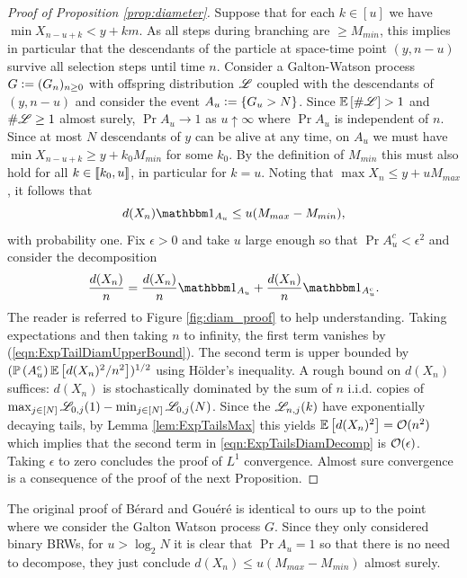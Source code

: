 \begin{proof}[Proof of Proposition \ref{prop:diameter}]
Suppose that for each $k \in [u]$ we have $\min X_{n - u + k} < y + k m$. As all steps during branching are $ \geq M_{min}$, this implies in particular that the descendants of the particle at space-time point $(y, n-u)$ survive all selection steps until time $n$. Consider a Galton-Watson process $G \defeq (G_n)_{n \geq 0}$ with offspring distribution $\scr{L}$ coupled with the descendants of $(y, n-u)$ and consider the event $A_u \defeq \{ G_u > N\}$. Since $\Ex{\#\scr{L}} > 1$ and $\#\scr{L} \geq 1$ almost surely, $\Pr{A_u} \to 1$ as $u \uparrow \infty$ where $\Pr{A_u}$ is independent of $n$. Since at most $N$ descendants of $y$ can be alive at any time, on $A_u$ we must have $\min X_{n - u + k} \geq y + k_0 M_{min}$ for some $k_0$. By the definition of $M_{min}$ this must also hold for all $k \in \bbracket{k_0, u}$, in particular for $k = u$. Noting that $\max X_n \leq y + u M_{max}$, it follows that 
\begin{equation}\label{eqn:ExpTailDiamUpperBound}
d(X_n)\Ind_{A_u} \leq u (M_{max} - M_{min}), 
\end{equation}
with probability one. Fix $\epsilon > 0$ and take $u$ large enough so that $\Pr{A_u^c} < \epsilon^2$ and consider the decomposition
\begin{equation}\label{eqn:ExpTailsDiamDecomp}
\frac{d(X_n)}{n} = \frac{d(X_n)}{n} \Ind_{A_u} + \frac{d(X_n)}{n} \Ind_{A_u^c}. 
\end{equation}
The reader is referred to Figure \ref{fig:diam_proof} to help understanding. Taking expectations and then taking $n$ to infinity, the first term vanishes by (\ref{eqn:ExpTailDiamUpperBound}). The second term is upper bounded by $(\Pr{A_u^c} \Ex{d(X_n)^2 / n^2})^{1/2}$ using Hölder's inequality. A rough bound on $d(X_n)$ suffices: $d(X_n)$ is stochastically dominated by the sum of $n$ i.i.d. copies of $\max_{j \in [N]} \scr{L}_{0, j}(1) - \min_{j \in [N]} \scr{L}_{0,j}(N)$. Since the $\scr{L}_{n,j}(k)$ have exponentially decaying tails, by Lemma \ref{lem:ExpTailsMax} this yields $\Ex{d(X_n)^2} = \cal{O}(n^2)$ which implies that the second term in \ref{eqn:ExpTailsDiamDecomp} is $\cal{O}(\epsilon)$. Taking $\epsilon$ to zero concludes the proof of $L^1$ convergence. Almost sure convergence is a consequence of the proof of the next Proposition. 
\end{proof}

The original proof of Bérard and Gouéré is identical to ours up to the point where we consider the Galton Watson process $G$. Since they only considered binary BRWs, for $u > \log_2 N$ it is clear that $\Pr{A_u} = 1$ so that there is no need to decompose, they just conclude $d(X_n) \leq u(M_{max} - M_{min})$ almost surely. 

